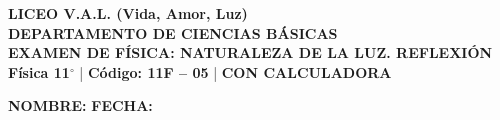 \documentclass[11pt, letterpaper]{article}
\begin{document}
	
	\begin{center}
		{\Large \textbf{\color{valblue} LICEO V.A.L. (Vida, Amor, Luz)}}\\[0.1cm]
		{\large \textbf{DEPARTAMENTO DE CIENCIAS BÁSICAS}}\\[0.1cm]
		{\large \textbf{EXAMEN DE FÍSICA: NATURALEZA DE LA
				LUZ. REFLEXIÓN}}\\[0.1cm]
		{\small \textbf{Física 11$^{\circ}$} \quad | \quad \textbf{Código: 11F -- 05} \quad | \quad \textbf{CON CALCULADORA}}
	\end{center}
	
	\vspace{0.2cm}
	\noindent \textbf{NOMBRE:} \underline{\hspace{8.5cm}} \hfill \textbf{FECHA:} \underline{\hspace{3cm}}
	\vspace{0.3cm}
	
	
	
\end{document}
